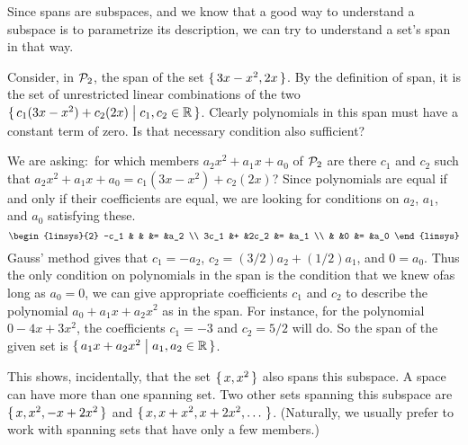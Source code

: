 Since spans are subspaces, and we know that a
good way to understand a subspace is
to parametrize its description, we can try to understand a set's span in 
that way.

\begin{example}
Consider, in \( \mathcal{P}_2 \), 
the span of the set \( \mbox{$\{\,3x-x^2, 2x\,\}$} \).
By the definition of span, it is the set of unrestricted linear
combinations of the two $\mbox{$\{\,c_1(3x-x^2)+c_2(2x)\bigm| c_1,c_2\in\mathbb{R}\,\}$}$.
Clearly polynomials in this span must have a constant term of zero.
Is that necessary condition also sufficient?

We are asking:~for which members $a_2x^2+a_1x+a_0$ 
of $\mathcal{P}_2$ are there $c_1$ and $c_2$ such that
$a_2x^2+a_1x+a_0=c_1(3x-x^2)+c_2(2x)$? 
Since polynomials are equal if and only if their coefficients are equal,
we are looking for conditions on $a_2$, $a_1$, and $a_0$ satisfying these.
\begin{equation*}
  \begin{linsys}{2}
    -c_1  &   &     &=  &a_2   \\
    3c_1  &+  &2c_2 &=  &a_1   \\
          &   &0    &=  &a_0                                   
  \end{linsys}
\end{equation*} 
Gauss' method gives that 
$c_1=-a_2$, $c_2=(3/2)a_2+(1/2)a_1$, and $0=a_0$.
Thus the only condition on polynomials in the span
is the condition that we knew of\Dash as long as $a_0=0$,
we can give appropriate coefficients $c_1$ and $c_2$
to describe the polynomial $a_0+a_1x+a_2x^2$ as in the span.
For instance, for the polynomial $0-4x+3x^2$, the coefficients
$c_1=-3$ and $c_2=5/2$ will do.
So the span of the given set is 
$\mbox{$\{\,a_1x+a_2x^2\bigm| a_1,a_2\in\mathbb{R}\,\}$}$. 

This shows, incidentally, that
the set \( \mbox{$\{\,x,x^2\,\}$} \) also spans this subspace.
A space can have more than one spanning set.
Two other sets spanning this subspace are
\( \mbox{$\{\,x,x^2,-x+2x^2\,\}$} \) and
\( \mbox{$\{\,x,x+x^2,x+2x^2,\ldots\,\,\}$} \).
(Naturally, we usually prefer to work with spanning sets that have only
a few members.)
\end{example}


